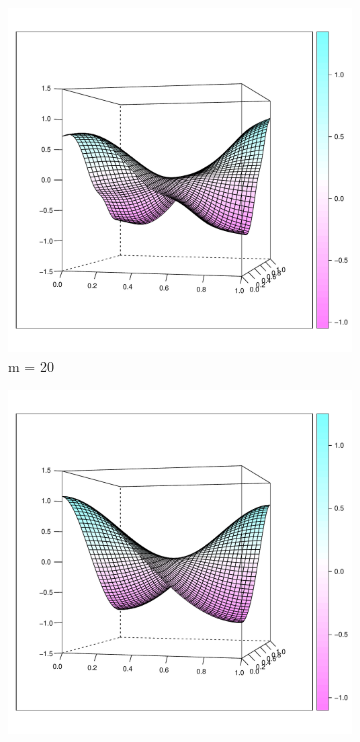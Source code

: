 \begin{figure}
        \begin{subfigure}[b]{0.40\textwidth}
                \centering
                \includegraphics[width=\textwidth]{Images-nonparametric/cy-fit-wireframe-m40.pdf}
                \caption{m = 20}
                \label{}
        \end{subfigure}
                \begin{subfigure}[b]{0.40\textwidth}
                \centering
                \includegraphics[width=\textwidth]{Images-nonparametric/cy-true-wireframe.pdf}

\end{subfigure}
\end{figure}
